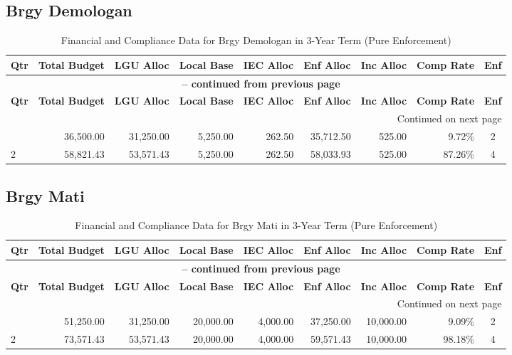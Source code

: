 \subsection{Brgy Demologan}
\begin{longtable}{lrrrrrrrc}
\caption{Financial and Compliance Data for Brgy Demologan in 3-Year Term (Pure Enforcement)} \\
\toprule
\textbf{Qtr} & \textbf{Total Budget} & \textbf{LGU Alloc} & \textbf{Local Base} & \textbf{IEC Alloc} & \textbf{Enf Alloc} & \textbf{Inc Alloc} & \textbf{Comp Rate} & \textbf{Enf} \\
\midrule
\endfirsthead
\multicolumn{9}{c}{{\bfseries \tablename\ \thetable{} -- continued from previous page}} \\
\toprule
\textbf{Qtr} & \textbf{Total Budget} & \textbf{LGU Alloc} & \textbf{Local Base} & \textbf{IEC Alloc} & \textbf{Enf Alloc} & \textbf{Inc Alloc} & \textbf{Comp Rate} & \textbf{Enf} \\
\midrule
\endhead
\hline \multicolumn{9}{r}{{Continued on next page}} \\ \hline
\endfoot
\bottomrule
\endlastfoot
1 & 36,500.00 & 31,250.00 & 5,250.00 & 262.50 & 35,712.50 & 525.00 & 9.72\% & 2 \\
2 & 58,821.43 & 53,571.43 & 5,250.00 & 262.50 & 58,033.93 & 525.00 & 87.26\% & 4 \\
\end{longtable}
\newpage
\subsection{Brgy Mati}
\begin{longtable}{lrrrrrrrc}
\caption{Financial and Compliance Data for Brgy Mati in 3-Year Term (Pure Enforcement)} \\
\toprule
\textbf{Qtr} & \textbf{Total Budget} & \textbf{LGU Alloc} & \textbf{Local Base} & \textbf{IEC Alloc} & \textbf{Enf Alloc} & \textbf{Inc Alloc} & \textbf{Comp Rate} & \textbf{Enf} \\
\midrule
\endfirsthead
\multicolumn{9}{c}{{\bfseries \tablename\ \thetable{} -- continued from previous page}} \\
\toprule
\textbf{Qtr} & \textbf{Total Budget} & \textbf{LGU Alloc} & \textbf{Local Base} & \textbf{IEC Alloc} & \textbf{Enf Alloc} & \textbf{Inc Alloc} & \textbf{Comp Rate} & \textbf{Enf} \\
\midrule
\endhead
\hline \multicolumn{9}{r}{{Continued on next page}} \\ \hline
\endfoot
\bottomrule
\endlastfoot
1 & 51,250.00 & 31,250.00 & 20,000.00 & 4,000.00 & 37,250.00 & 10,000.00 & 9.09\% & 2 \\
2 & 73,571.43 & 53,571.43 & 20,000.00 & 4,000.00 & 59,571.43 & 10,000.00 & 98.18\% & 4 \\
\end{longtable}
\newpage
